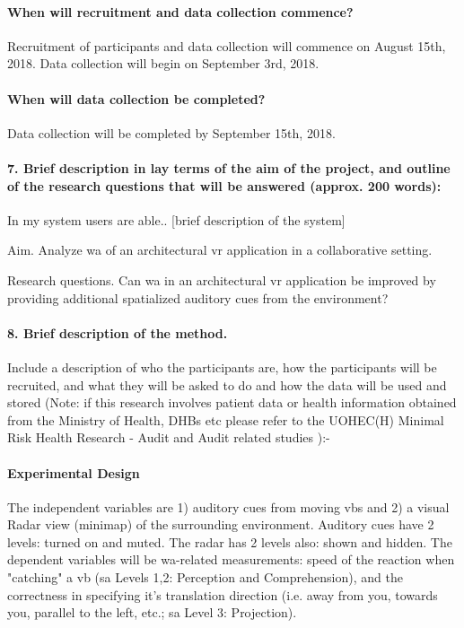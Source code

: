 \paragraph{When will recruitment and data collection commence?}


Recruitment of participants and data collection will commence on August 15th, 2018. Data collection will begin on September 3rd, 2018.
\paragraph{When will data collection be completed?}


Data collection will be completed by September 15th, 2018.
\paragraph{7.	Brief description in lay terms of the aim of the project, and outline of the research questions that will be answered (approx. 200 words):}


In my system users are able.. [brief description of the system]

Aim. Analyze \gls{wa} of an architectural \gls{vr} application in a collaborative setting.

Research questions. Can \gls{wa} in an architectural \gls{vr} application be improved by providing additional spatialized auditory cues from the environment?
\paragraph{8.	Brief description of the method.} Include a description of who the participants are, how the participants will be recruited, and what they will be asked to do and how the data will be used and stored (Note: if this research involves patient data or health information obtained from the Ministry of Health, DHBs etc please refer to the UOHEC(H) Minimal Risk Health Research  - Audit and Audit related studies ):-

\paragraph{Experimental Design}

The independent variables are 1) auditory cues from moving \gls{vb}s and 2) a visual Radar view (minimap) of the surrounding environment. Auditory cues have 2 levels: turned on and muted. The radar has 2 levels also: shown and hidden.
The dependent variables will be \gls{wa}-related measurements: speed of the reaction when "catching" a \gls{vb} (\gls{sa} Levels 1,2: Perception and Comprehension), and the correctness in specifying it's translation direction (i.e. away from you, towards you, parallel to the left, etc.; \gls{sa} Level 3: Projection).

